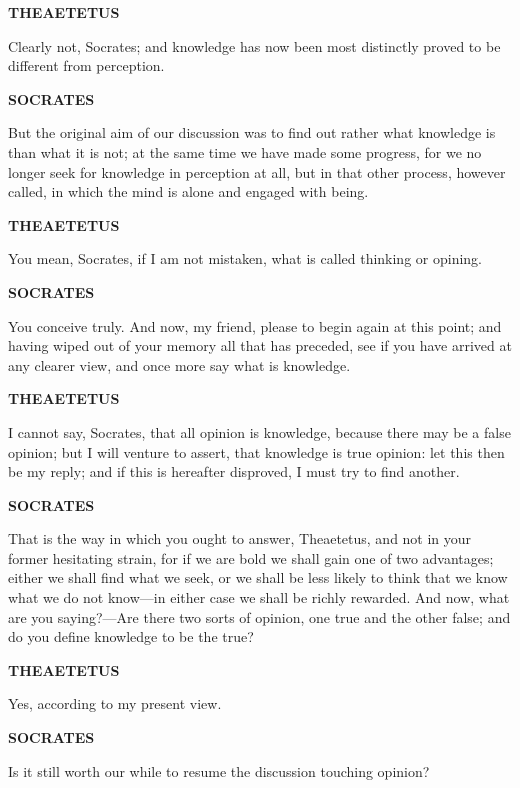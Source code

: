\documentclass[11pt,letter]{article}
\begin{document}
\par \textbf{THEAETETUS}
\par   Clearly not, Socrates; and knowledge has now been most distinctly proved to be different from perception.

\par \textbf{SOCRATES}
\par   But the original aim of our discussion was to find out rather what knowledge is than what it is not; at the same time we have made some progress, for we no longer seek for knowledge in perception at all, but in that other process, however called, in which the mind is alone and engaged with being.

\par \textbf{THEAETETUS}
\par   You mean, Socrates, if I am not mistaken, what is called thinking or opining.

\par \textbf{SOCRATES}
\par   You conceive truly. And now, my friend, please to begin again at this point; and having wiped out of your memory all that has preceded, see if you have arrived at any clearer view, and once more say what is knowledge.

\par \textbf{THEAETETUS}
\par   I cannot say, Socrates, that all opinion is knowledge, because there may be a false opinion; but I will venture to assert, that knowledge is true opinion:  let this then be my reply; and if this is hereafter disproved, I must try to find another.

\par \textbf{SOCRATES}
\par   That is the way in which you ought to answer, Theaetetus, and not in your former hesitating strain, for if we are bold we shall gain one of two advantages; either we shall find what we seek, or we shall be less likely to think that we know what we do not know—in either case we shall be richly rewarded. And now, what are you saying?—Are there two sorts of opinion, one true and the other false; and do you define knowledge to be the true?

\par \textbf{THEAETETUS}
\par   Yes, according to my present view.

\par \textbf{SOCRATES}
\par   Is it still worth our while to resume the discussion touching opinion?
\end{document}
